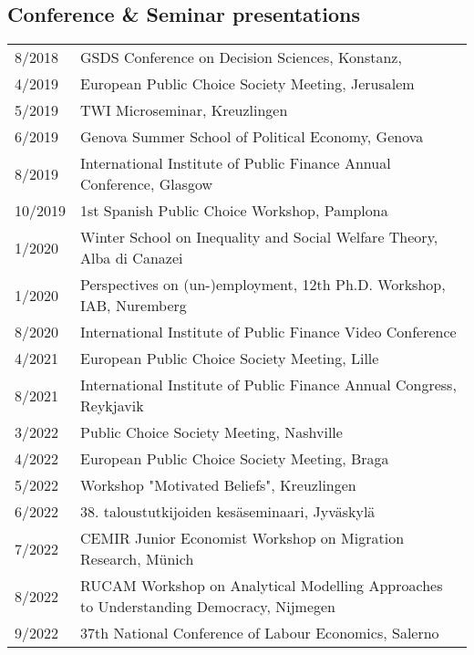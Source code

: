 \documentclass[16pt]{article}
\begin{document}
\subsection*{Conference \& Seminar presentations}
\begin{tabular}{@{}p{1.5in}p{5in}}
8/2018             & GSDS Conference on Decision Sciences, Konstanz,\\
4/2019             & European Public Choice Society Meeting, Jerusalem\\
5/2019             & TWI Microseminar, Kreuzlingen \\
6/2019             & Genova Summer School of Political Economy, Genova \\
8/2019             & International Institute of Public Finance Annual Conference, Glasgow \\
10/2019           & 1st Spanish Public Choice Workshop, Pamplona \\
1/2020             & Winter School on Inequality and Social Welfare Theory, Alba di Canazei \\
1/2020             & Perspectives on (un-)employment, 12th Ph.D. Workshop, IAB, Nuremberg \\
8/2020             & International Institute of Public Finance Video Conference \\
4/2021             & European Public Choice Society Meeting, Lille \\
8/2021             & International Institute of Public Finance Annual Congress, Reykjavik \\
3/2022             & Public Choice Society Meeting, Nashville \\
4/2022             & European Public Choice Society Meeting, Braga \\
5/2022             & Workshop "Motivated Beliefs", Kreuzlingen \\
6/2022             & 38. taloustutkijoiden kesäseminaari, Jyväskylä \\
7/2022             & CEMIR Junior Economist Workshop on Migration Research, Münich \\
8/2022             & RUCAM Workshop on Analytical Modelling Approaches to Understanding Democracy, Nijmegen \\
9/2022             &  37th National Conference of Labour Economics, Salerno
\end{tabular}
\end{document}
